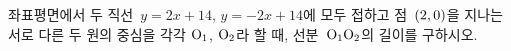좌표평면에서 두 직선~$y=2x+14$, $y=-2x+14$에 모두 접하고 점~$(2{,}\mkern3mu 0)$을 지나는 서로 다른 두 원의 중심을 각각 $\mathrm{O_1}$, $\mathrm{O_2}$라 할 때, 선분~$\mathrm{O_1O_2}$의 길이를 구하시오.
